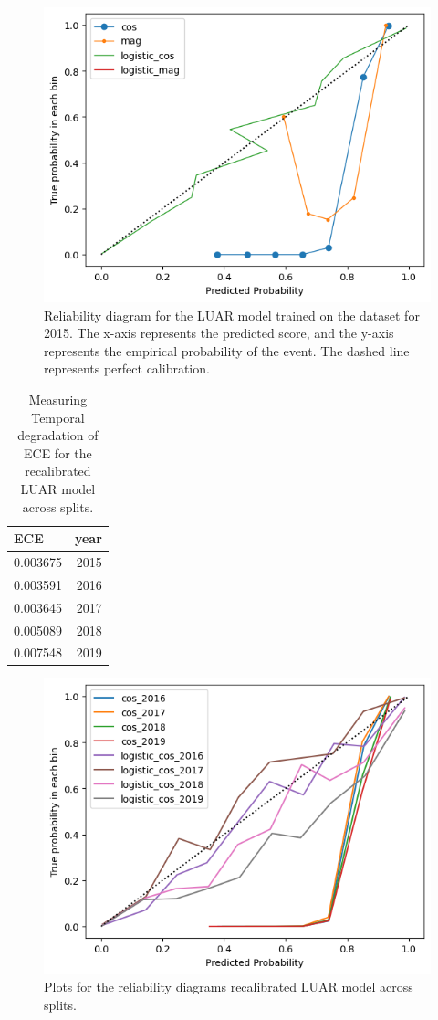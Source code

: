 \begin{figure}
    \centering
    \includegraphics[width=0.7\linewidth]{stylometryExtensions/figures/calibration_expts/calibrate_2015.png}
    \caption{Reliability diagram for the LUAR model trained on the \DSvarydelta{} dataset for 2015. The x-axis represents the predicted score, and the y-axis represents the empirical probability of the event. The dashed line represents perfect calibration.}
    \label{fig:calibration:relaibility_2015}
\end{figure}

\begin{table}[]
\centering
\begin{tabular}{lr}
\toprule
 ECE  & year \\
\midrule
  0.003675 &2015 \\
  0.003591 &2016 \\
  0.003645 &2017 \\
  0.005089 &2018 \\
  0.007548 &2019 \\
 \bottomrule
\end{tabular}
    \caption{Measuring Temporal degradation of ECE for the recalibrated LUAR model across \DSvarydelta{} splits.}
    \label{tab:calib:init}
\end{table}

\begin{figure}
    \centering
    \includegraphics[width=0.8\linewidth]{stylometryExtensions/figures/calibration_expts/eval_calibration.png}
    \caption{Plots for the reliability diagrams recalibrated LUAR model across \DSvarydelta{} splits.}
    \label{fig:calibration:reliability_2016_2019}
\end{figure}

